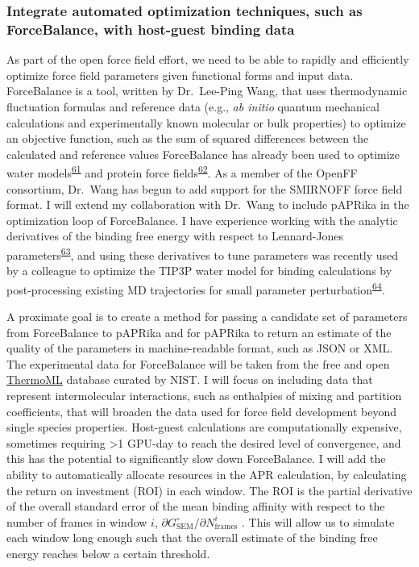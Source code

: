 \documentclass[11pt,notitlepage]{article}
\begin{document}
\hypertarget{integrate-automated-optimization-techniques-such-as-forcebalance-with-host-guest-binding-data-1}{%
\subsubsection{Integrate automated optimization techniques, such as
ForceBalance, with host-guest binding
data}\label{integrate-automated-optimization-techniques-such-as-forcebalance-with-host-guest-binding-data-1}}

As part of the open force field effort, we need to be able to rapidly
and efficiently optimize force field parameters given functional forms
and input data. ForceBalance is a tool, written by Dr.~Lee-Ping Wang,
that uses thermodynamic fluctuation formulas and reference data (e.g.,
\emph{ab initio} quantum mechanical calculations and experimentally
known molecular or bulk properties) to optimize an objective function,
such as the sum of squared differences between the calculated and
reference values ForceBalance has already been used to optimize water
models\textsuperscript{\protect\hyperlink{ref-50lAQZra}{61}} and protein
force fields\textsuperscript{\protect\hyperlink{ref-1E3wArY0j}{62}}. As
a member of the OpenFF consortium, Dr.~Wang has begun to add support for
the SMIRNOFF force field format. I will extend my collaboration with
Dr.~Wang to include pAPRika in the optimization loop of ForceBalance. I
have experience working with the analytic derivatives of the binding
free energy with respect to Lennard-Jones
parameters\textsuperscript{\protect\hyperlink{ref-xRauI5mb}{63}}, and
using these derivatives to tune parameters was recently used by a
colleague to optimize the TIP3P water model for binding calculations by
post-processing existing MD trajectories for small parameter
perturbation\textsuperscript{\protect\hyperlink{ref-NeqIQDLp}{64}}.

A proximate goal is to create a method for passing a candidate set of
parameters from ForceBalance to pAPRika and for pAPRika to return an
estimate of the quality of the parameters in machine-readable format,
such as JSON or XML. The experimental data for ForceBalance will be
taken from the free and open
\href{https://www.nist.gov/mml/acmd/trc/thermoml}{ThermoML} database
curated by NIST. I will focus on including data that represent
intermolecular interactions, such as enthalpies of mixing and partition
coefficients, that will broaden the data used for force field
development beyond single species properties. Host-guest calculations
are computationally expensive, sometimes requiring \textgreater{}1
GPU-day to reach the desired level of convergence, and this has the
potential to significantly slow down ForceBalance. I will add the
ability to automatically allocate resources in the APR calculation, by
calculating the return on investment (ROI) in each window. The ROI is
the partial derivative of the overall standard error of the mean binding
affinity with respect to the number of frames in window \(i\),
\(\partial G^\circ_\text{SEM} / \partial N^i_\text{frames}\) . This will
allow us to simulate each window long enough such that the overall
estimate of the binding free energy reaches below a certain threshold.
\end{document}

